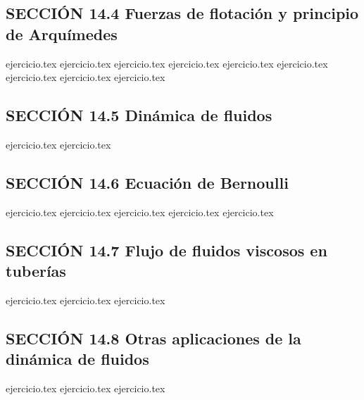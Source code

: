 \subsection*{SECCIÓN 14.4 Fuerzas de flotación y principio de Arquímedes}
\begin{enumerate}
    \setcounter{enumi}{10}
    {ejercicio.tex}
    {ejercicio.tex}
    {ejercicio.tex}
    {ejercicio.tex}
    {ejercicio.tex}
    {ejercicio.tex}
    {ejercicio.tex}
    {ejercicio.tex}
    {ejercicio.tex}
\end{enumerate}

\subsection*{SECCIÓN 14.5 Dinámica de fluidos}
\begin{enumerate}
    \setcounter{enumi}{19}
    {ejercicio.tex}
    {ejercicio.tex}
\end{enumerate}

\subsection*{SECCIÓN 14.6 Ecuación de Bernoulli}
\begin{enumerate}
    \setcounter{enumi}{21}
    {ejercicio.tex}
    {ejercicio.tex}
    {ejercicio.tex}
    {ejercicio.tex}
    {ejercicio.tex}
\end{enumerate}

\subsection*{SECCIÓN 14.7 Flujo de fluidos viscosos en tuberías}
\begin{enumerate}
    \setcounter{enumi}{26}
    {ejercicio.tex}
    {ejercicio.tex}
    {ejercicio.tex}
\end{enumerate}

\subsection*{SECCIÓN 14.8 Otras aplicaciones de la dinámica de fluidos}
\begin{enumerate}
    \setcounter{enumi}{29}
    {ejercicio.tex}
    {ejercicio.tex}
    {ejercicio.tex}
\end{enumerate}


